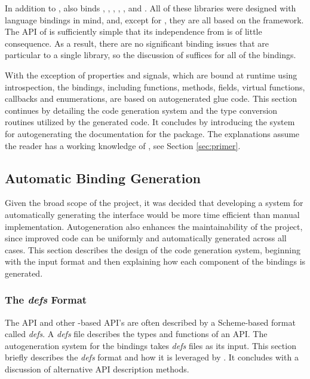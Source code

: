 \documentclass[article]{jss}
\begin{document}
In addition to ,  also binds
, , , , , and .
All of these libraries were designed with language bindings in mind, and, except
for , they are all based on the  framework. The API of
 is sufficiently simple that its independence from  is
of little consequence. As a result, there are no significant binding issues that
are particular to a single library, so the discussion of  suffices
for all of the bindings. 

With the exception of properties and signals, which are bound at runtime
using introspection, the  bindings, including functions, methods,
fields, virtual functions, callbacks and enumerations, are based on autogenerated glue code. 
This section continues by detailing the code generation system and the
type conversion routines utilized by the generated code. It concludes by 
introducing the system for autogenerating the  documentation for
the package. The explanations assume the reader has a working knowledge of 
, see Section \ref{sec:primer}.

\subsection{Automatic Binding Generation}

Given the broad scope of the project, it was decided that developing a system
for automatically generating the interface would be more time efficient than
manual implementation. Autogeneration also enhances the maintainability of the 
project, since improved code can be uniformly and automatically generated across
all cases. This section describes the design of the code generation system,
beginning with the input format and then explaining how each component of
the bindings is generated.

\subsubsection[The defs Format]{The \emph{defs} Format}

The  API and other -based API's are often described by
a Scheme-based format called \emph{defs}. A \emph{defs} file describes the types
and functions of an API. The autogeneration system for the  bindings
takes \emph{defs} files as its input. This section briefly describes the 
\emph{defs} format and how it is leveraged by . It concludes
with a discussion of alternative API description methods.
\end{document}
